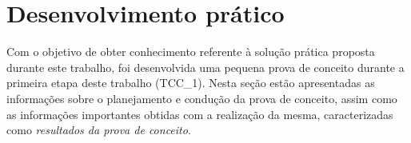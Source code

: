 








\section{Desenvolvimento prático} %
\label{sec:desenvolvimento_prático}

	Com o objetivo de obter conhecimento referente à solução prática proposta durante este trabalho, foi desenvolvida uma pequena prova de conceito durante a primeira etapa deste trabalho (TCC\_1). Nesta seção estão apresentadas as informações sobre o planejamento e condução da prova de conceito, assim como as informações importantes obtidas com a realização da mesma, caracterizadas como \textit{resultados da prova de conceito}.

